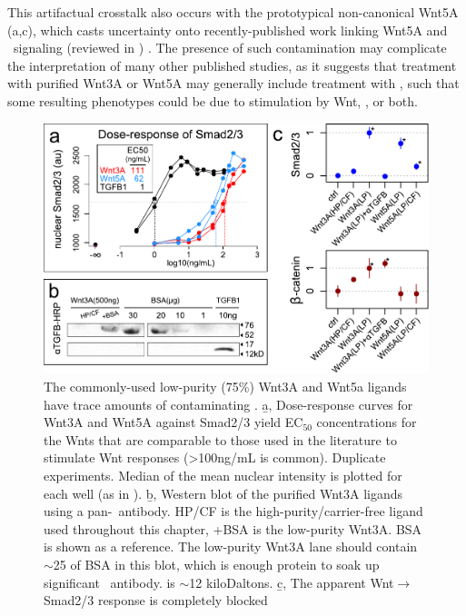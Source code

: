 This artifactual crosstalk also occurs with the prototypical non-canonical
Wnt5A (a,c), which casts
uncertainty onto recently-published work
linking Wnt5A and \tgf\ signaling
(reviewed in ) \cite{Miyoshi2012}.
The presence of such contamination may complicate the
interpretation of many other published studies, as it
suggests that treatment with purified Wnt3A or Wnt5A may generally include treatment
with \tgf, such that some resulting phenotypes 
could be due to stimulation by Wnt, \tgf,
or both.


  \begin{figure}[!bt]
  \centering
  \includegraphics[width=5in]{FIGS/insulation/contamination+.pdf}
  {\singlespacing 
  \caption[Contamination of commonly-used commercial Wnt3A.]
        { The commonly-used low-purity (75\%) Wnt3A and Wnt5a ligands have
          trace amounts of contaminating \tgf.
          \b{a}, Dose-response curves
          for Wnt3A and Wnt5A against Smad2/3 yield EC$_{50}$ concentrations for
          the Wnts that are comparable to those used in the literature
          to stimulate Wnt responses (>100ng/mL is common).
          Duplicate experiments. Median of the mean nuclear
          intensity is plotted for each well (as in ).
          \b{b}, Western blot of
          the purified Wnt3A ligands using a pan-\tgf\ antibody. HP/CF
          is the high-purity/carrier-free ligand used throughout this
          chapter, +BSA is the low-purity Wnt3A. BSA is shown as a reference.
          The low-purity Wnt3A lane should contain
          $\sim$25 of BSA in this blot, which is enough protein
          to soak up significant \tgf\ antibody.
           is $\sim$12 kiloDaltons.
          \b{c}, The apparent Wnt$\rightarrow$Smad2/3 response is completely blocked
}}
\end{figure}

